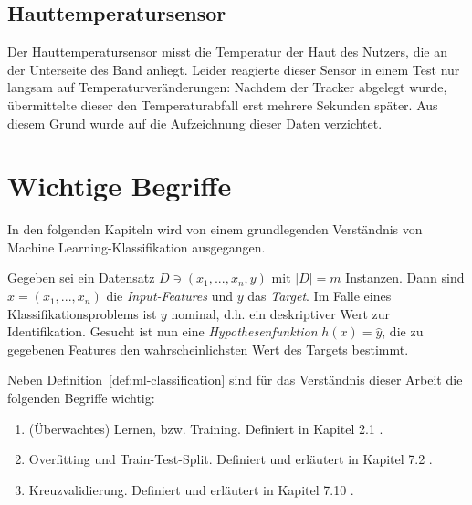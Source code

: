 \subsection{Hauttemperatursensor}
Der Hauttemperatursensor misst die Temperatur der Haut des Nutzers, die an der Unterseite des Band anliegt. Leider reagierte dieser Sensor in einem Test nur langsam auf Temperaturveränderungen: Nachdem der Tracker abgelegt wurde, übermittelte dieser den Temperaturabfall erst mehrere Sekunden später. Aus diesem Grund wurde auf die Aufzeichnung dieser Daten verzichtet.


\section{Wichtige Begriffe}
In den folgenden Kapiteln wird von einem grundlegenden Verständnis von Machine Learning-Klassifikation ausgegangen.

\begin{definition}[ML-Klassifikation]
\label{def:ml-classification}
Gegeben sei ein Datensatz $D \ni (x_1, ..., x_n, y)$ mit $|D| = m$ Instanzen. Dann sind $x = (x_1, ..., x_n)$ die \textit{Input-Features} und $y$ das \textit{Target}. Im Falle eines Klassifikationsproblems ist $y$ nominal, d.h. ein deskriptiver Wert zur Identifikation. Gesucht ist nun eine \textit{Hypothesenfunktion} $h(x) = \hat{y}$, die zu gegebenen Features den wahrscheinlichsten Wert des Targets bestimmt\cite{Ng2011a}.
\end{definition}
Neben Definition~\ref{def:ml-classification} sind für das Verständnis dieser Arbeit die folgenden Begriffe wichtig:
\begin{enumerate}
\item (Überwachtes) Lernen, bzw. Training. Definiert in Kapitel 2.1 \cite{Hastie2009}.
\item Overfitting und Train-Test-Split. Definiert und erläutert in Kapitel 7.2 \cite{Hastie2009}.
\item Kreuzvalidierung. Definiert und erläutert in Kapitel 7.10 \cite{Hastie2009}.
\end{enumerate}


